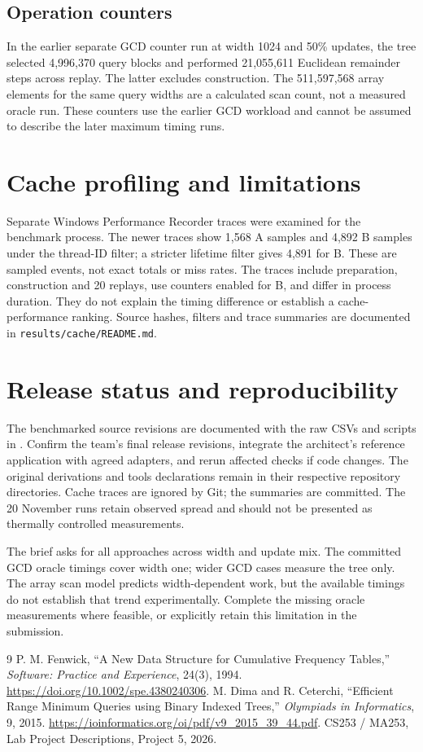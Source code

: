 \documentclass[11pt,a4paper]{article}
\begin{document}
\subsection{Operation counters}
In the earlier separate GCD counter run at width 1024 and 50\% updates, the tree selected 4,996,370 query blocks and performed 21,055,611 Euclidean remainder steps across replay. The latter excludes construction. The 511,597,568 array elements for the same query widths are a calculated scan count, not a measured oracle run. These counters use the earlier GCD workload and cannot be assumed to describe the later maximum timing runs.
\section{Cache profiling and limitations}
Separate Windows Performance Recorder traces were examined for the benchmark process. The newer traces show 1,568 A samples and 4,892 B samples under the thread-ID filter; a stricter lifetime filter gives 4,891 for B. These are sampled events, not exact totals or miss rates. The traces include preparation, construction and 20 replays, use counters enabled for B, and differ in process duration. They do not explain the timing difference or establish a cache-performance ranking. Source hashes, filters and trace summaries are documented in \texttt{results/cache/README.md}.
\section{Release status and reproducibility}
The benchmarked source revisions are documented with the raw CSVs and scripts in . Confirm the team's final release revisions, integrate the architect's reference application with agreed adapters, and rerun affected checks if code changes. The original derivations and tools declarations remain in their respective repository directories. Cache traces are ignored by Git; the summaries are committed. The 20 November runs retain observed spread and should not be presented as thermally controlled measurements.

The brief asks for all approaches across width and update mix. The committed GCD oracle timings cover width one; wider GCD cases measure the tree only. The array scan model predicts width-dependent work, but the available timings do not establish that trend experimentally. Complete the missing oracle measurements where feasible, or explicitly retain this limitation in the submission.
\clearpage
\begin{thebibliography}{9}
 P. M. Fenwick, ``A New Data Structure for Cumulative Frequency Tables,'' \emph{Software: Practice and Experience}, 24(3), 1994. \url{https://doi.org/10.1002/spe.4380240306}.
 M. Dima and R. Ceterchi, ``Efficient Range Minimum Queries using Binary Indexed Trees,'' \emph{Olympiads in Informatics}, 9, 2015. \url{https://ioinformatics.org/oi/pdf/v9_2015_39_44.pdf}.
 CS253 / MA253, Lab Project Descriptions, Project 5, 2026.
\end{thebibliography}
\end{document}
